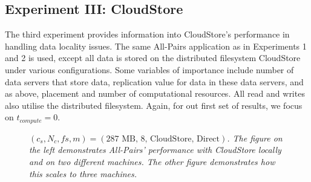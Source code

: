 \documentclass{rspublic}
\newcommand{\micnote}[1]{ {\textcolor{blue} { ***Michael: #1 }}}
\newcommand{\betynote}[1]{ {\textcolor{orange} { ***Bety: #1 }}}
\newcommand{\jhanote}[1]{} \newcommand{\micnote}[1]{}\newcommand{\betynote}[1]{} \newcommand{\fixme}[1]{}
\begin{document}
\subsection{Experiment III: CloudStore} 
The third experiment provides information into CloudStore's performance
in handling data locality issues. The same All-Pairs application as in
Experiments 1 and 2 is used, except all data is stored on the
distributed filesystem CloudStore under various configurations. Some
variables of importance include number of data servers that store data,
replication value for data in these data servers, and as above,
placement and number of computational resources.  All read and writes
also utilise the distributed filesystem. Again, for out first set of
results, we focus on $t_{compute}=0$.  
\begin{center}
\begin{figure}
\caption{\textit{$(c_s, N_c, fs, m) = (\mbox{287 MB, 8, CloudStore, Direct})$. The figure on the left demonstrates All-Pairs'
performance with CloudStore locally and on two different machines. The
other figure demonstrates how this scales to three machines.}
\jhanote{This caption needs attention}}
\label{Fig:experiment3}
\end{figure}
\end{center}
\end{document}

